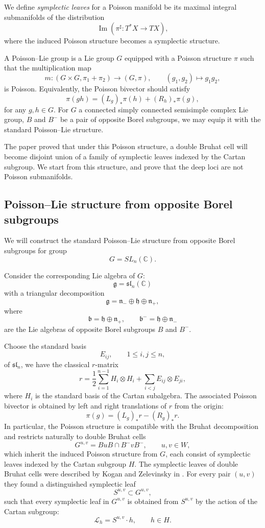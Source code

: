 \documentclass[12pt]{amsart}
\theoremstyle{plain}
\theoremstyle{definition}
\theoremstyle{remark}
\begin{document}
We define \emph{symplectic leaves} for a Poisson manifold be its maximal integral
submanifolds of the distribution
\[
\operatorname{Im}(\pi^\sharp:T^*X\rightarrow TX),
\]
where the induced Poisson structure becomes a symplectic structure.

A Poisson--Lie group is a Lie group $G$ equipped with a Poisson structure $\pi$ such that the multiplication map
\[
m:(G\times G, \pi_1+\pi_2)\rightarrow (G,\pi), \qquad (g_1,g_2)\mapsto g_1g_2,
\]
is Poisson. Equivalently, the Poisson bivector should satisfy
\[
\pi(gh)
=
(L_g)_*\pi(h)+(R_h)_*\pi(g),
\]
for any $g,h\in G$. For $G$ a connected simply connected semisimple complex Lie group, $B$ and $B^-$ be a pair of opposite Borel subgroups, we may equip it with the standard Poisson--Lie structure. 

The paper \cite{KZ02} proved that under this Poisson structure, a double Bruhat cell will become disjoint union of a family of symplectic leaves indexed by the Cartan subgroup. We start from this structure, and prove that the deep loci are not Poisson submanifolds.

\subsection{Poisson--Lie structure from opposite Borel subgroups}

We will construct the standard Poisson--Lie structure from opposite Borel subgroups for group
\[
G=SL_n(\mathbb C).
\]

Consider the corresponding Lie algebra of $G$:
\[
\mathfrak g=\mathfrak{sl}_n(\mathbb C)
\]
with a triangular decomposition
\[
\mathfrak g=\mathfrak n_-\oplus\mathfrak h\oplus\mathfrak n_+,
\]
where $$\mathfrak b=\mathfrak h\oplus\mathfrak n_+,\qquad \mathfrak b^-=\mathfrak h\oplus\mathfrak n_-$$ are the Lie algebras
of opposite Borel subgroups $B$ and $B^-$.

Choose the standard basis
\[
E_{ij},\qquad 1\leq i,j\leq n,
\]
of $\mathfrak{sl}_n$, we have the classical $r$-matrix
\[
r=\frac12\sum_{i=1}^{n-1}H_i\otimes H_i+\sum_{i<j}E_{ij}\otimes E_{ji},
\]
where $H_i$ is the standard basis of the Cartan subalgebra. The associated Poisson bivector is obtained by left and right translations of $r$ from the origin:
\[
\pi(g)=(L_g)_*r-(R_g)_*r .
\]
In particular, the Poisson structure is compatible with the Bruhat decomposition and restricts naturally to double Bruhat cells
\[
G^{u,v}=B uB\cap B^- vB^- ,\qquad u,v\in W,
\]
which inherit the induced Poisson structure from $G$, each consist of symplectic leaves indexed by the Cartan subgroup $H$. The symplectic leaves of double Bruhat cells were described by Kogan and Zelevinsky in \cite{KZ02}. For every pair $(u,v)$ they found a distinguished symplectic leaf
\[
S^{u,v}\subset G^{u,v},
\]
such that every symplectic leaf in $G^{u,v}$ is obtained from
$S^{u,v}$ by the action of the Cartan subgroup:
\[
\mathcal L_h=S^{u,v}\cdot h,
\qquad h\in H .
\]
\end{document}
